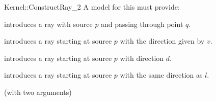 \begin{ccRefFunctionObjectConcept}{Kernel::ConstructRay_2}
A model for this must provide:


            {introduces a ray  
             with source $p$ and passing through point $q$.}

            {introduces a ray starting at source $p$ with 
             the direction given by $v$.}

            {introduces a ray  starting at source $p$ with 
             direction $d$.}

            {introduces a ray  starting at source $p$ with 
             the same direction as $l$.}

\ccRefines
{} (with two arguments)

\ccSeeAlso
{}\\

\end{ccRefFunctionObjectConcept}
